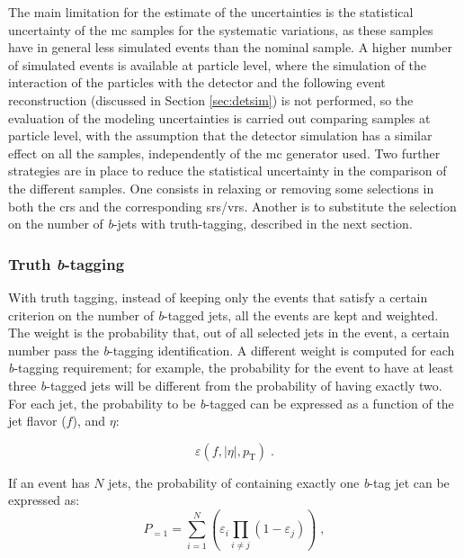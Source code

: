The main limitation for the estimate of the uncertainties is the statistical uncertainty of the \gls{mc} samples for the systematic variations, as these samples have in general less simulated events than the nominal sample. 
A higher number of simulated events is available at particle level, where the simulation of the interaction of the particles with the detector and the following event reconstruction (discussed in Section \ref{sec:detsim}) is not performed, so the evaluation of the \ttbar modeling uncertainties is carried out 
comparing samples at particle level, with the assumption that the detector simulation has a similar effect on all the samples, 
independently of the \gls{mc} generator used. Two further strategies are in place to reduce the statistical uncertainty in the comparison of the different samples. 
One consists in relaxing or removing some selections in both the \glspl{cr} and the corresponding \glspl{sr}/\glspl{vr}. 
Another is to substitute the selection on the number of \textit{b}-jets with truth-tagging, described in the next section.

\subsubsection*{Truth \textit{b}-tagging}

With truth tagging, instead of keeping only the events that satisfy a certain criterion on the number of \textit{b}-tagged jets, all the events are kept and weighted. The weight is the probability that, out of all selected jets in the event,
a certain number pass the \textit{b}-tagging identification.
A different weight is computed for each \textit{b}-tagging requirement; 
for example, the probability for the event to have at least three \textit{b}-tagged jets will be different from the probability of having exactly two. 
For each jet, the probability to be \textit{b}-tagged can be expressed as a function of the jet flavor ($f$), \pt and $\eta$:

\begin{equation}
\varepsilon \left(f,|\eta|,p_{\mathrm{T}}\right) \; . 
\label{eq:susy_common:btageff}
\end{equation}

\noindent If an event has $N$ jets, the probability of containing exactly one \textit{b}-tag jet can be expressed as:
\begin{equation}
        P_{=1} = \sum\limits_{i=1}^N \left( \varepsilon_{i} \prod\limits_{i \neq j} \left( 1 - \varepsilon_{j} \right) \right) \; , \nonumber
\end{equation}

